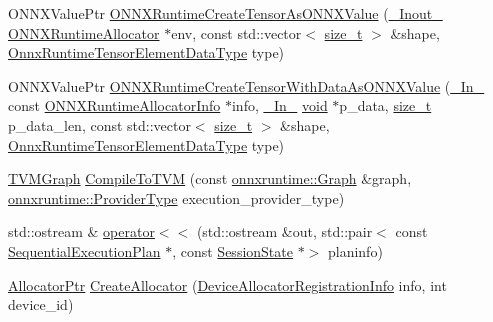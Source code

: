 \begin{DoxyCompactItemize}
\item 
O\+N\+N\+X\+Value\+Ptr \mbox{\hyperlink{namespaceonnxruntime_a2b7951372d06d39431033e6036bb06a9}{O\+N\+N\+X\+Runtime\+Create\+Tensor\+As\+O\+N\+N\+X\+Value}} (\mbox{\hyperlink{visibility__macros_8h_a198d136b8176ee5824b09c7bd8b7beb0}{\+\_\+\+Inout\+\_\+}} \mbox{\hyperlink{session_2allocator_8h_a9eb4a70849a17d41aca1955b07cdfaca}{O\+N\+N\+X\+Runtime\+Allocator}} $\ast$env, const std\+::vector$<$ \mbox{\hyperlink{mlasi_8h_a503efbc1c6e50825320ad909366b78ab}{size\+\_\+t}} $>$ \&shape, \mbox{\hyperlink{tensor__type__and__shape__c__api_8h_acc48f6a9c9e4d7071352e45ce13324b3}{Onnx\+Runtime\+Tensor\+Element\+Data\+Type}} type)
\item 
O\+N\+N\+X\+Value\+Ptr \mbox{\hyperlink{namespaceonnxruntime_a9ef7df1ce928bb454ae46bd4a0cad005}{O\+N\+N\+X\+Runtime\+Create\+Tensor\+With\+Data\+As\+O\+N\+N\+X\+Value}} (\mbox{\hyperlink{visibility__macros_8h_aa74f89aa7d942f4a79ea12d7c9b763ef}{\+\_\+\+In\+\_\+}} const \mbox{\hyperlink{structONNXRuntimeAllocatorInfo}{O\+N\+N\+X\+Runtime\+Allocator\+Info}} $\ast$info, \mbox{\hyperlink{visibility__macros_8h_aa74f89aa7d942f4a79ea12d7c9b763ef}{\+\_\+\+In\+\_\+}} \mbox{\hyperlink{mlasi_8h_a88f941d423cb2a819b70a1358982b1a6}{void}} $\ast$p\+\_\+data, \mbox{\hyperlink{mlasi_8h_a503efbc1c6e50825320ad909366b78ab}{size\+\_\+t}} p\+\_\+data\+\_\+len, const std\+::vector$<$ \mbox{\hyperlink{mlasi_8h_a503efbc1c6e50825320ad909366b78ab}{size\+\_\+t}} $>$ \&shape, \mbox{\hyperlink{tensor__type__and__shape__c__api_8h_acc48f6a9c9e4d7071352e45ce13324b3}{Onnx\+Runtime\+Tensor\+Element\+Data\+Type}} type)
\item 
\mbox{\hyperlink{structonnxruntime_1_1TVMGraph}{T\+V\+M\+Graph}} \mbox{\hyperlink{namespaceonnxruntime_a4b3dbf1759aa7c7299c88497c70c633a}{Compile\+To\+T\+VM}} (const \mbox{\hyperlink{classonnxruntime_1_1Graph}{onnxruntime\+::\+Graph}} \&graph, \mbox{\hyperlink{namespaceonnxruntime_a863e2227cbf32aab76aad35fdadff4bb}{onnxruntime\+::\+Provider\+Type}} execution\+\_\+provider\+\_\+type)
\item 
std\+::ostream \& \mbox{\hyperlink{namespaceonnxruntime_a310735a2d99a62a07608f3cc75b53f2a}{operator$<$$<$}} (std\+::ostream \&out, std\+::pair$<$ const \mbox{\hyperlink{structonnxruntime_1_1SequentialExecutionPlan}{Sequential\+Execution\+Plan}} $\ast$, const \mbox{\hyperlink{classonnxruntime_1_1SessionState}{Session\+State}} $\ast$$>$ planinfo)
\item 
\mbox{\hyperlink{namespaceonnxruntime_a6cdac724c5dcefded3a63f08dae58fda}{Allocator\+Ptr}} \mbox{\hyperlink{namespaceonnxruntime_ab043113cd835e58659310492a0d5bcec}{Create\+Allocator}} (\mbox{\hyperlink{structonnxruntime_1_1DeviceAllocatorRegistrationInfo}{Device\+Allocator\+Registration\+Info}} info, int device\+\_\+id)
$$
\end{DoxyCompactItemize}
